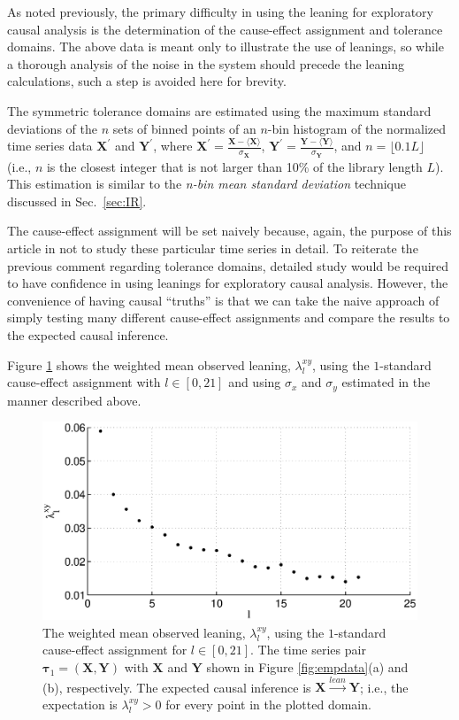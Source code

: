 \documentclass[twocolumn,aps,pre,groupedaddress]{revtex4-1}
\begin{document}
As noted previously, the primary difficulty in using the leaning for exploratory causal analysis is the determination of the cause-effect assignment and tolerance domains.  The above data is meant only to illustrate the use of leanings, so while a thorough analysis of the noise in the system should precede the leaning calculations, such a step is avoided here for brevity.  

The symmetric tolerance domains are estimated using the maximum standard deviations of the $n$ sets of binned points of an $n$-bin histogram of the normalized time series data $\mathbf{X}^\prime$ and $\mathbf{Y}^\prime$, where $\mathbf{X}^\prime = \frac{\mathbf{X}-\langle \mathbf{X} \rangle}{\sigma_\mathbf{X}}$, $\mathbf{Y}^\prime = \frac{\mathbf{Y}-\langle \mathbf{Y} \rangle}{\sigma_\mathbf{Y}}$, and $n=\lfloor 0.1L\rfloor$ (i.e., $n$ is the closest integer that is not larger than 10\% of the library length $L$).  This estimation is similar to the {\em n-bin mean standard deviation} technique discussed in Sec.\ \ref{sec:IR}.

The cause-effect assignment will be set naively because, again, the purpose of this article in not to study these particular time series in detail.  To reiterate the previous comment regarding tolerance domains, detailed study would be required to have confidence in using leanings for exploratory causal analysis.  However, the convenience of having causal ``truths'' is that we can take the naive approach of simply testing many different cause-effect assignments and compare the results to the expected causal inference.

Figure \ref{fig:emp} shows the weighted mean observed leaning, $\lambda_l^{xy}$, using the $1$-standard cause-effect assignment with $l\in[0,21]$ and using $\sigma_x$ and $\sigma_y$ estimated in the manner described above.    
\begin{figure}
\includegraphics[scale=0.40]{EmpiricalData_p87leans.eps}
\caption{The weighted mean observed leaning, $\lambda_l^{xy}$, using the $1$-standard cause-effect assignment for $l\in[0,21]$.  The time series pair $\mathbf{\tau}_1 = (\mathbf{X},\mathbf{Y})$ with $\mathbf{X}$ and $\mathbf{Y}$ shown in Figure \ref{fig:empdata}(a) and (b), respectively.  The expected causal inference is $\mathbf{X}\xrightarrow{lean}\mathbf{Y}$; i.e., the expectation is $\lambda_l^{xy} > 0$ for every point in the plotted domain.}
\label{fig:emp}
\end{figure}
\end{document}
